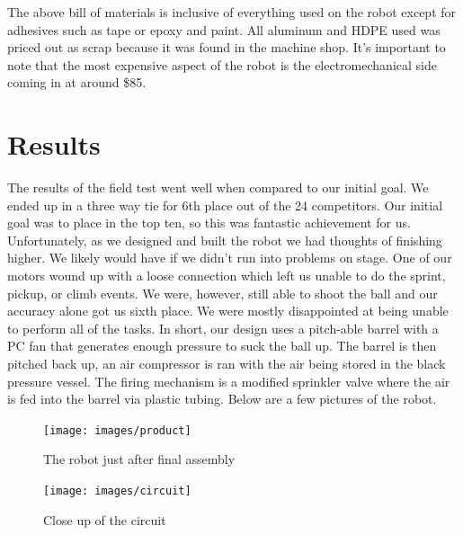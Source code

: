 \documentclass[12pt,letterpaper,titlepage]{article}
\begin{document}
The above bill of materials is inclusive of everything used on the robot except for adhesives such as tape or epoxy and paint. All aluminum and HDPE used was priced out as scrap because it was found in the machine shop. It's important to note that the most expensive aspect of the robot is the electromechanical side coming in at around \$85.



\section{Results}

The results of the field test went well when compared to our initial goal. We ended up in a three way tie for 6th place out of the 24 competitors. Our initial goal was to place in the top ten, so this was fantastic achievement for us. Unfortunately, as we designed and built the robot we had thoughts of finishing higher. We likely would have if we didn't run into problems on stage. One of our motors wound up with a loose connection which left us unable to do the sprint, pickup, or climb events. We were, however, still able to shoot the ball and our accuracy alone got us sixth place. We were mostly disappointed at being unable to perform all of the tasks. In short, our design uses a pitch-able barrel with a PC fan that generates enough pressure to suck the ball up. The barrel is then pitched back up, an air compressor is ran with the air being stored in the black pressure vessel. The firing mechanism is a modified sprinkler valve where the air is fed into the barrel via plastic tubing. Below are a few pictures of the robot.

\begin{figure}[H]
	\centering
	\texttt{[image: images/product]}
	\label{fig:product}
	\caption{The robot just after final assembly}
\end{figure}

\begin{figure}[H]
	\centering
	\texttt{[image: images/circuit]}
	\label{fig:circuit}
	\caption{Close up of the circuit}
\end{figure}
\end{document}
